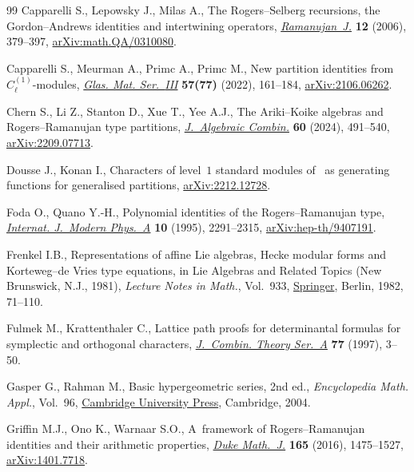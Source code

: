 \documentclass[pdftex]{sigma}
\numberwithin{equation}{section}
\begin{document}
\begin{thebibliography}{99}
Capparelli S., Lepowsky J., Milas A., The {R}ogers--{S}elberg recursions, the
 {G}ordon--{A}ndrews identities and intertwining operators,
 \href{https://doi.org/10.1007/s11139-006-0150-7}{\textit{Ramanujan~J.}}
 \textbf{12} (2006), 379--397,
 \href{http://arxiv.org/abs/math.QA/0310080}{arXiv:math.QA/0310080}.

Capparelli S., Meurman A., Primc A., Primc M., New partition identities
 from~{$C^{(1)}_\ell$}-modules,
 \href{https://doi.org/10.3336/gm.57.2.01}{\textit{Glas. Mat. Ser.~{III}}}
 \textbf{57(77)} (2022), 161--184,
 \href{http://arxiv.org/abs/2106.06262}{arXiv:2106.06262}.

Chern S., Li Z., Stanton D., Xue T., Yee A.J., The {A}riki--{K}oike algebras
 and {R}ogers--{R}amanujan type partitions,
 \href{https://doi.org/10.1007/s10801-024-01340-z}{\textit{J.~Algebraic
 Combin.}} \textbf{60} (2024), 491--540,
 \href{http://arxiv.org/abs/2209.07713}{arXiv:2209.07713}.

Dousse J., Konan I., Characters of level~$1$ standard modules of~ as
 generating functions for generalised partitions,
 \href{http://arxiv.org/abs/2212.12728}{arXiv:2212.12728}.

Foda O., Quano Y.-H., Polynomial identities of the {R}ogers--{R}amanujan type,
 \href{https://doi.org/10.1142/S0217751X9500111X}{\textit{Internat. J.~Modern
 Phys.~A}} \textbf{10} (1995), 2291--2315,
 \href{http://arxiv.org/abs/hep-th/9407191}{arXiv:hep-th/9407191}.

Frenkel I.B., Representations of affine {L}ie algebras, {H}ecke modular forms
 and {K}orteweg--de {V}ries type equations, in Lie Algebras and Related Topics
 ({N}ew {B}runswick, {N}.{J}., 1981), \textit{Lecture Notes in Math.}, Vol.~933, \href{https://doi.org/10.1007/BFb0093354}{Springer}, Berlin, 1982,
 71--110.

Fulmek M., Krattenthaler C., Lattice path proofs for determinantal formulas for
 symplectic and orthogonal characters,
 \href{https://doi.org/10.1006/jcta.1996.2711}{\textit{J.~Combin. Theory
 Ser.~A}} \textbf{77} (1997), 3--50.

Gasper G., Rahman M., Basic hypergeometric series, 2nd ed., \textit{Encyclopedia Math.
 Appl.}, Vol.~96,
 \href{https://doi.org/10.1017/CBO9780511526251}{Cambridge University Press},
 Cambridge, 2004.

Griffin M.J., Ono K., Warnaar S.O., A~framework of {R}ogers--{R}amanujan
 identities and their arithmetic properties,
 \href{https://doi.org/10.1215/00127094-3449994}{\textit{Duke Math.~J.}}
 \textbf{165} (2016), 1475--1527,
 \href{http://arxiv.org/abs/1401.7718}{arXiv:1401.7718}.


\end{thebibliography}
\end{document}
